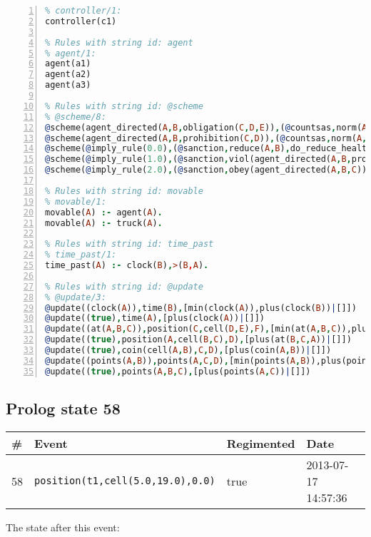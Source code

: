 \documentclass[11pt]{article}\usepackage[utf8]{inputenc}\usepackage{geometry}
\begin{document}
\begin{lstlisting}[language=Prolog, numbers=left]
% Rules with string id: controller
% controller/1:
controller(c1)

% Rules with string id: agent
% agent/1:
agent(a1)
agent(a2)
agent(a3)

% Rules with string id: @scheme
% @scheme/8:
@scheme(agent_directed(A,B,obligation(C,D,E)),(@countsas,norm(A,B,F,obligation(C,D,E)),F),false,(listTrue(C)),(time_past(D)),false,[plus(viol(agent_directed(A,B,obligation(C,D,E))))|[]],[plus(obey(agent_directed(A,B,obligation(C,D,E))))|[]])
@scheme(agent_directed(A,B,prohibition(C,D)),(@countsas,norm(A,B,E,prohibition(C,D)),E),(listTrue(C)),false,(false),false,[plus(viol(agent_directed(A,B,prohibition(C,D))))|[]],[plus(obey(agent_directed(A,B,prohibition(C,D))))|[]])
@scheme(@imply_rule(0.0),(@sanction,reduce(A,B),do_reduce_health(A,B),notifyAgent(A,changed(status))),true,false,false,false,[min(reduce(A,B))|[]],[])
@scheme(@imply_rule(1.0),(@sanction,viol(agent_directed(A,B,prohibition(C,D))),do_sanction(D)),true,false,false,false,[min(viol(agent_directed(A,B,prohibition(C,D))))|[]],[])
@scheme(@imply_rule(2.0),(@sanction,obey(agent_directed(A,B,C))),true,false,false,false,[min(obey(agent_directed(A,B,C)))|[]],[])

% Rules with string id: movable
% movable/1:
movable(A) :- agent(A).
movable(A) :- truck(A).

% Rules with string id: time_past
% time_past/1:
time_past(A) :- clock(B),>(B,A).

% Rules with string id: @update
% @update/3:
@update((clock(A)),time(B),[min(clock(A)),plus(clock(B))|[]])
@update((true),time(A),[plus(clock(A))|[]])
@update((at(A,B,C)),position(C,cell(D,E),F),[min(at(A,B,C)),plus(at(D,E,C))|[]])
@update((true),position(A,cell(B,C),D),[plus(at(B,C,A))|[]])
@update((true),coin(cell(A,B),C,D),[plus(coin(A,B))|[]])
@update((points(A,B)),points(A,C,D),[min(points(A,B)),plus(points(A,D))|[]])
@update((true),points(A,B,C),[plus(points(A,C))|[]])

\end{lstlisting}
\clearpage 
\subsection{Prolog state 58}
\begin{table}[ht]
\centering 
\begin{tabular}{l l l l} 
\textbf{\#} & \textbf{Event} & \textbf{Regimented} & \textbf{Date} \\ [0.5ex] 
\hline
58&\texttt{position(t1,cell(5.0,19.0),0.0)}&true&2013-07-17 14:57:36\\ [1ex] \hline\end{tabular}
\end{table}
The state after this event:
\end{document}
